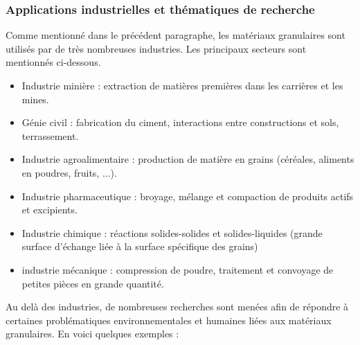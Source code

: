 		\subsubsection{Applications industrielles et thématiques de recherche}
			Comme mentionné dans le précédent paragraphe, les matériaux granulaires sont utilisés par de très nombreuses industries. Les principaux secteurs sont mentionnés ci-dessous.
			\begin{itemize}
				\item Industrie minière : extraction de matières premières dans les carrières et les mines.
				\item Génie civil : fabrication du ciment, interactions entre constructions et sols, terrassement.
				\item Industrie agroalimentaire : production de matière en grains (céréales, aliments en poudres, fruits, ...).
				\item Industrie pharmaceutique : broyage, mélange et compaction de produits actifs et excipients.
				\item Industrie chimique : réactions solides-solides et solides-liquides (grande surface d'échange liée à la surface spécifique des grains)
				\item industrie mécanique : compression de poudre, traitement et convoyage de petites pièces en grande quantité.
			\end{itemize}
			Au delà des industries, de nombreuses recherches sont menées afin de répondre à certaines problématiques environnementales et humaines liées aux matériaux granulaires. En voici quelques exemples :
